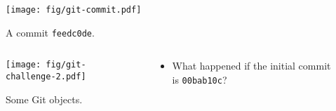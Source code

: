 \begin{frame}
  \begin{figure}
    \texttt{[image: fig/git-commit.pdf]}
    \caption{A commit \texttt{feedc0de}.}
  \end{figure}
\end{frame}

\begin{frame}
  \begin{exercise}
    \begin{columns}
      \begin{column}{0.40\columnwidth}
        \begin{figure}
          \texttt{[image: fig/git-challenge-2.pdf]}
          \caption{Some Git objects.}
        \end{figure}
      \end{column}
      \begin{column}{0.45\columnwidth}
        \begin{itemize}
          \item What happened if the initial commit is \texttt{00bab10c}?
        \end{itemize}
      \end{column}
    \end{columns}
  \end{exercise}
\end{frame}


